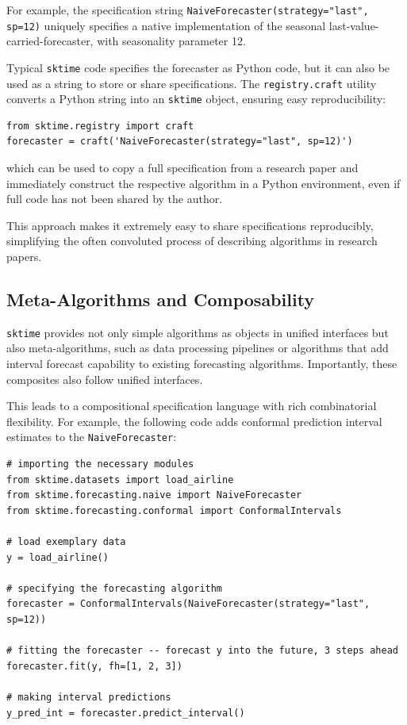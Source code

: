 For example, the specification string 
\texttt{NaiveForecaster(strategy="last", sp=12)}
uniquely specifies a native implementation of the seasonal last-value-carried-forecaster, with seasonality parameter 12.

Typical \texttt{sktime} code specifies the forecaster as Python code, but it can also be used as a string to store or share specifications. The \texttt{registry.craft} utility converts a Python string into an \texttt{sktime} object, ensuring easy reproducibility:

\begin{verbatim}
from sktime.registry import craft
forecaster = craft('NaiveForecaster(strategy="last", sp=12)')
\end{verbatim}
which can be used to copy a full specification from a research paper and immediately construct the respective algorithm in a Python environment, even if full code has not been shared by the author.

This approach makes it extremely easy to share specifications reproducibly, simplifying the often convoluted process of describing algorithms in research papers.

\subsection{Meta-Algorithms and Composability}
\texttt{sktime} provides not only simple algorithms as objects in unified interfaces but also meta-algorithms, such as data processing pipelines or algorithms that add interval forecast capability to existing forecasting algorithms. Importantly, these composites also follow unified interfaces.

This leads to a compositional specification language with rich combinatorial flexibility. For example, the following code adds conformal prediction interval estimates to the \texttt{NaiveForecaster}:

\begin{verbatim}
# importing the necessary modules
from sktime.datasets import load_airline
from sktime.forecasting.naive import NaiveForecaster
from sktime.forecasting.conformal import ConformalIntervals

# load exemplary data
y = load_airline()

# specifying the forecasting algorithm
forecaster = ConformalIntervals(NaiveForecaster(strategy="last", sp=12))

# fitting the forecaster -- forecast y into the future, 3 steps ahead
forecaster.fit(y, fh=[1, 2, 3])

# making interval predictions
y_pred_int = forecaster.predict_interval()
\end{verbatim}

